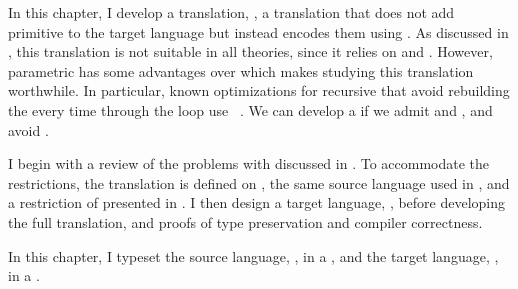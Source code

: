 \label{sec:param-cc:intro}
In this chapter, I develop a 
translation, \ie, a  translation that does not add
primitive  to the target language but instead encodes them using
.
As discussed in , this translation is not suitable in all
 theories, since it relies on  and
.
However, parametric  has some advantages over  which makes studying this translation worthwhile.
In particular, known optimizations for recursive  that avoid
rebuilding the  every time through the loop use ~\cite{minamide1996,morrisett1998:reccc}.
We can develop a  if we admit
 and , and avoid .

I begin with a review of the problems with 
discussed in .
To accommodate the restrictions, the 
translation is defined on \pccslang, the same source language used
in , and a restriction of \slang presented
in .
I then design a target language, \pcctlang, before developing the full
translation, and proofs of type preservation and compiler correctness.

\begin{typographical}
 In this chapter, I typeset the source language, \pccslang, in
 a \emph{}, and the target
 language, \pcctlang, in a \emph{}.
\end{typographical}
